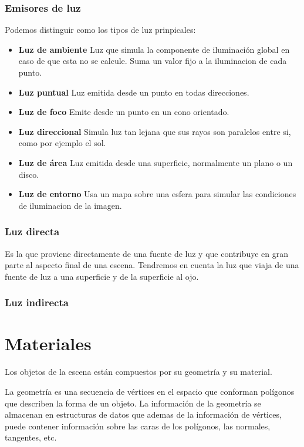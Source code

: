         \subsubsection{Emisores de luz}
        Podemos distinguir como los tipos de luz prinpicales:
        \begin{itemize}
            \item[] \textbf {Luz de ambiente} Luz que simula la componente de iluminaci\'on global en caso de que esta no se calcule. Suma un valor fijo a la iluminacion de cada punto.
            \item[] \textbf {Luz puntual} Luz emitida desde un punto en todas direcciones.
            \item[] \textbf {Luz de foco} Emite desde un punto en un cono orientado.
            \item[] \textbf {Luz direccional} Simula luz tan lejana que sus rayos son paralelos entre si, como por ejemplo el sol.
            \item[] \textbf {Luz de \'area} Luz emitida desde una superficie, normalmente un plano o un disco.
            \item[] \textbf {Luz de entorno} Usa un mapa sobre una esfera para simular las condiciones de iluminacion de la imagen.
        \end{itemize}

        \subsubsection{Luz directa}
        Es la que proviene directamente de una fuente de luz y que contribuye en gran parte al aspecto final de una escena. Tendremos
        en cuenta la luz que viaja de una fuente de luz a una superficie y de la superficie al ojo.
        \subsubsection{Luz indirecta}


\section{Materiales}
    Los objetos de la escena est\'an compuestos por su geometr\'ia y su material.

    La geometr\'ia es una secuencia de v\'ertices en el espacio que conforman pol\'igonos que describen la forma de un objeto. La informaci\'on de la
    geometr\'ia se almacenan en estructuras de datos que ademas de la informaci\'on de v\'ertices, puede contener informaci\'on sobre las caras de los
    pol\'igonos, las normales, tangentes, etc.

